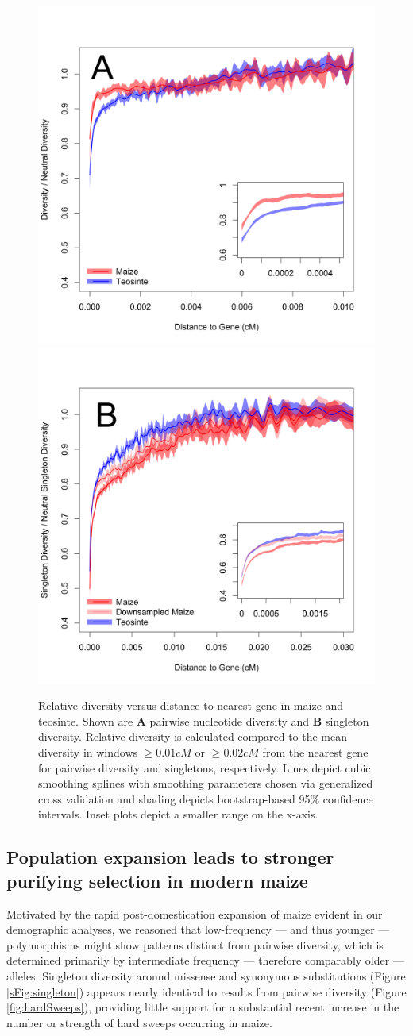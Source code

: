 \documentclass[12pt,a4paper]{article}
\begin{document}
\begin{figure}[!tb]
\centering
\includegraphics[width=.45\textwidth]{FigsAndFiles/distanceToGene_WithSignificance_Folded2_manuscript.png} \includegraphics[width=.45\textwidth]{FigsAndFiles/distanceToGene_WithSignificance_Singletons_Downsampled_threeLines_manuscript.png}
\caption{Relative diversity versus distance to nearest gene in maize and teosinte. 
Shown are \textbf{A} pairwise nucleotide diversity and \textbf{B} singleton diversity.  
Relative diversity is calculated compared to the mean diversity in windows $\geq 0.01 cM$ or $\geq 0.02 cM$ from the nearest
gene for pairwise diversity and singletons, respectively. 
  Lines depict cubic smoothing splines with smoothing parameters chosen via generalized cross validation and shading depicts bootstrap-based 95\% confidence intervals.
  Inset plots depict a smaller range on the x-axis. \label{fig:purify}
  }
\end{figure}

\subsection*{Population expansion leads to stronger purifying selection in modern maize} %
Motivated by the rapid post-domestication expansion of maize evident in our demographic analyses, we reasoned that low-frequency --- and thus younger --- polymorphisms might show patterns distinct from pairwise diversity, which is determined primarily by intermediate frequency --- therefore comparably older --- alleles. 
Singleton diversity around missense and synonymous substitutions (Figure \ref{sFig:singleton}) appears nearly identical to results from pairwise diversity (Figure \ref{fig:hardSweeps}), providing little support for a substantial recent increase in the number or strength of hard sweeps occurring in maize. 
\end{document}
